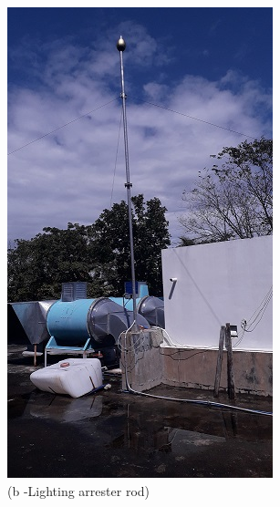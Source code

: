 \begin{figure}
\begin{minipage}[b]{0.25\linewidth}
				\includegraphics[width=\textwidth]{figures/R1P_lightning/lightningarrester.jpg}
		\caption*{(b -Lighting arrester rod)}
	\end{minipage}
	\hspace{0.05cm}
	\begin{minipage}[b]{0.25\linewidth}
		\centering

\end{minipage}
\end{figure}
